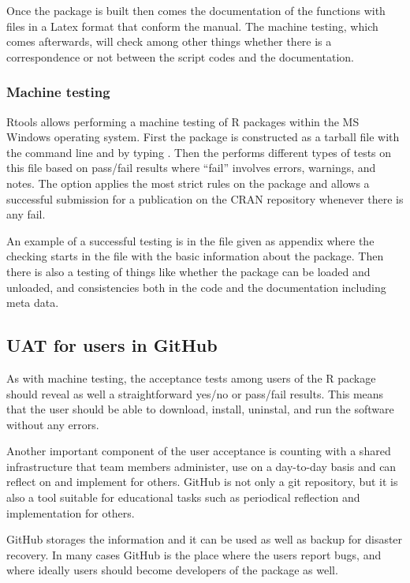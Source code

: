 \documentclass[oneside,a4paper]{memoir} %
\begin{document}
Once the package is built then comes the documentation of the functions with files in a Latex format that conform the manual. The machine testing, which comes afterwards, will check among other things whether there is a correspondence or not between the script codes and the documentation. 


\subsubsection{Machine testing}
\textsf{Rtools} allows performing a machine testing of \textsf{R} packages within the MS Windows operating system. First the package is constructed as a tarball file with the command line and by typing . Then the  performs different types of tests on this file based on pass/fail results where \enquote{fail} involves errors, warnings, and notes. The option  applies the most strict rules on the package and allows a successful submission for a publication on the CRAN repository whenever there is any fail. 

An example of a successful testing is in the  file given as appendix where the checking starts in the  file with the basic information about the package. Then there is also a testing of things like whether the package can be loaded and unloaded, and consistencies both in the code and the documentation including meta data.



\subsection{UAT for users in GitHub}
As with machine testing, the acceptance tests among users of the \textsf{R} package should reveal as well a straightforward yes/no or pass/fail results. This means that the user should be able to download, install, uninstal, and run the software without any errors. 

Another important component of the user acceptance is counting with a shared infrastructure that team members administer, use on a day-to-day basis and can reflect on and implement for others. 
GitHub is not only a git repository, but it is also a tool suitable for educational tasks such as periodical reflection and implementation for others. 

GitHub storages the information and it can be used as well as backup for disaster recovery. In many cases GitHub is the place where the users report bugs, and where ideally users should become developers of the package as well. 
\end{document}
